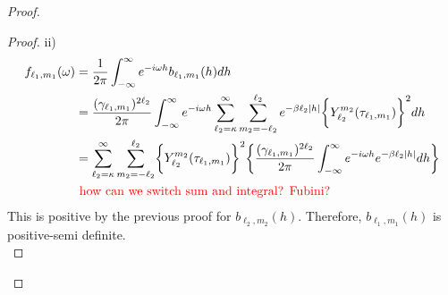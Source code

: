 \documentclass[11pt]{article}
\begin{document}
\begin{itemize}
\begin{proof}
\begin{enumerate}
\begin{proof}
ii)\\
\begin{align*}
f_{\ell_1,m_1}(\omega) &= \frac{1}{2\pi} \int_{-\infty}^\infty e^{-i\omega h} b_{\ell_1,m_1}(h) dh\\
&= \frac{(\gamma_{\ell_1,m_1})^{2 \ell_2}}{2\pi} \int_{-\infty}^\infty e^{-i\omega h} \sum_{\ell_2=\kappa}^{\infty} \sum_{m_2=-\ell_2}^{\ell_2} e^{-\beta \ell_2 |h|} \biggl\{Y_{\ell_2}^{m_2}(\tau_{\ell_1,m_1}) \biggl\}^2 dh\\
&= \sum_{\ell_2=\kappa}^{\infty} \sum_{m_2=-\ell_2}^{\ell_2} \biggl\{Y_{\ell_2}^{m_2}(\tau_{\ell_1,m_1}) \biggl\}^2 \biggl\{  \frac{(\gamma_{\ell_1,m_1})^{2 \ell_2}}{2\pi} \int_{-\infty}^\infty e^{-i\omega h} e^{-\beta \ell_2 |h|} dh \biggl\}\\
&{\color{red} \text{ how can we switch sum and integral? Fubini?}}\\
\end{align*}
This is positive by the previous proof for $b_{\ell_2,m_2}(h)$. Therefore, $b_{\ell_1,m_1}(h)$ is positive-semi definite.\\
\end{proof}



\end{enumerate}
\end{proof}
\end{itemize}
\end{document}
